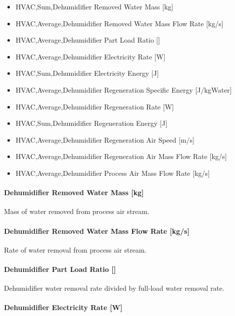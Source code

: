 \begin{itemize}
\item
  HVAC,Sum,Dehumidifier Removed Water Mass {[}kg{]}
\item
  HVAC,Average,Dehumidifier Removed Water Mass Flow Rate {[}kg/s{]}
\item
  HVAC,Average,Dehumidifier Part Load Ratio {[]}
\item
  HVAC,Average,Dehumidifier Electricity Rate {[}W{]}
\item
  HVAC,Sum,Dehumidifier Electricity Energy {[}J{]}
\item
  HVAC,Average,Dehumidifier Regeneration Specific Energy {[}J/kgWater{]}
\item
  HVAC,Average,Dehumidifier Regeneration Rate {[}W{]}
\item
  HVAC,Sum,Dehumidifier Regeneration Energy {[}J{]}
\item
  HVAC,Average,Dehumidifier Regeneration Air Speed {[}m/s{]}
\item
  HVAC,Average,Dehumidifier Regeneration Air Mass Flow Rate {[}kg/s{]}
\item
  HVAC,Average,Dehumidifier Process Air Mass Flow Rate {[}kg/s{]}
\end{itemize}

\paragraph{Dehumidifier Removed Water Mass {[}kg{]}}\label{dehumidifier-removed-water-mass-kg}

Mass of water removed from process air stream.

\paragraph{Dehumidifier Removed Water Mass Flow Rate {[}kg/s{]}}\label{dehumidifier-removed-water-mass-flow-rate-kgs}

Rate of water removal from process air stream.

\paragraph{Dehumidifier Part Load Ratio {[]}}\label{dehumidifier-part-load-ratio}

Dehumidifier water removal rate divided by full-load water removal rate.

\paragraph{Dehumidifier Electricity Rate {[}W{]}}\label{dehumidifier-electric-power-w}

